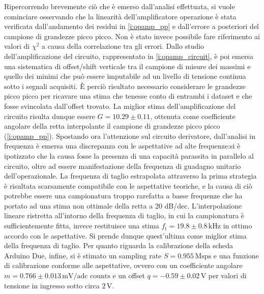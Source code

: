 \documentclass[a4paper,11pt]{article} %
\begin{document}
Ripercorrendo brevemente ciò che è emerso dall'analisi effettuata, si vuole cominciare osservando che la linearità
dell'amplificatore operazione è stata verificata dall'andamento dei residui in \autoref{i:opamp_pp} e dall'errore a
posteriori del campione di grandezze picco picco. Non è stato invece possibile fare riferimento ai valori di $\chi^2$ a
causa della correlazione tra gli errori. Dallo studio dell'amplificazione del circuito, rappresentato in
\autoref{i:opamp_circuit}, è poi emersa una sistematica di offset/shift verticale tra il campione di misure dei massimi
e quello dei minimi che può essere imputabile ad un livello di tensione continua sotto i segnali acquisiti. È perciò
risultato necessario considerare le grandezze picco picco per ricavare una stima che tenesse conto di entrambi i dataset
e che fosse svincolata dall'offset trovato. La miglior stima dell'amplificazione del circuito risulta dunque essere
$G=10.29 \pm 0.11$, ottenuta come coefficiente angolare della retta interpolante il campione di grandezze picco picco
(\autoref{i:opamp_pp}). Spostando ora l'attenzione sul circuito derivatore, dall'analisi in frequenza è emersa una
discrepanza con le aspettative ad alte frequenze:si è ipotizzato che la causa fosse la presenza di una capacità
parassita in parallelo al circuito, oltre ad essere manifestazione della frequenza di guadagno unitario
dell'operazionale. La frequenza di taglio estrapolata attraverso la prima strategia è risultata scarsamente compatibile
con le aspettative teoriche, e la causa di ciò potrebbe essere una campionatura troppo rarefatta a basse frequenze che
ha portato ad una stima non ottimale della retta a 20 dB/dec. L'interpolazione lineare ristretta all'intorno della
frequenza di taglio, in cui la campionatura è sufficientemente fitta, invece restituisce una stima $f_{\text{t}}=19.8
\pm 0.8\,\si{\kHz}$ in ottimo accordo con le aspettative. Si prende dunque quest'ultima come miglior stima della
frequenza di taglio. Per quanto riguarda la calibrazione della scheda Arduino Due, infine, si è stimato un sampling rate
$S = 0.955\,\text{Msps}$ e una funzione di calibrazione conforme alle aspettative, ovvero con un coefficiente angolare
$m=0.766\pm 0.013\,\text{mV/adc counts}$ e un offset $q=-0.59\pm0.02\,\si{\volt}$ per valori di tensione in ingresso
sotto circa $2\,\si{\volt}$.


\end{document}
